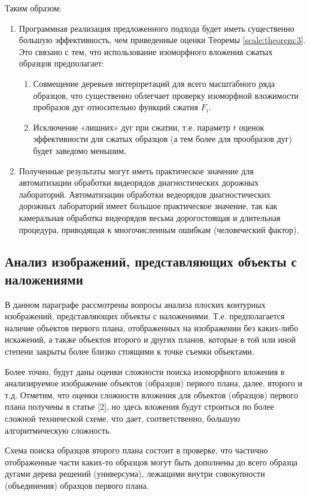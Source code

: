 Таким образом:
\begin{enumerate}
\item  Программная реализация предложенного подхода будет иметь существенно большую эффективность, чем приведенные оценки  Теоремы \ref{scale:theorem:3}. Это связано с тем, что использование изоморфного вложения сжатых образцов предполагает:
\begin{enumerate}
\item Совмещение деревьев интерпретаций для всего масштабного ряда образцов, что существенно облегчает проверку изоморфной вложимости пробразов дуг относительно функций сжатия $F_i$. 
\item Исключение «лишних» дуг при сжатии, т.е. параметр $t$ оценок эффективности  для сжатых образцов (а тем более для прообразов дуг) будет заведомо меньшим.  
\end{enumerate}
\item Полученные результаты могут иметь практическое значение для автоматизации обработки видеорядов диагностических дорожных лабораторий.  Автоматизации обработки ведеорядов диагностических дорожных лабораторий имеет большое практическое значение, так как камеральная обработка видеорядов весьма дорогостоящая и длительная процедура, приводящая к многочисленным ошибкам (человеческий фактор).  
\end{enumerate}


\subsection{Анализ изображений, представляющих объекты с наложениями}

В данном параграфе рассмотрены вопросы анализа плоских контурных изображений, представляющих объекты с наложениями. Т.е. предполагается наличие объектов первого плана, отображенных на изображении без каких-либо искажений,  а также объектов второго и других планов, которые в той или иной степени закрыты более близко стоящими к точке съемки объектами.

Более точно, будут даны оценки сложности поиска изоморфного вложения в анализируемое изображение объектов (образцов) первого плана, далее, второго и т.д. Отметим, что оценки сложности вложения для объектов (образцов) первого плана получены в статье  [2], но здесь вложения будут строиться по более сложной технической схеме, что дает, соответственно,  большую алгоритмическую сложность.

Схема поиска образцов второго плана состоит в проверке, что частично отображенные части каких-то образцов могут быть дополнены до всего образца дугами дерева решений (универсума), лежащими внутри  совокупности (объединения) образцов первого плана.

